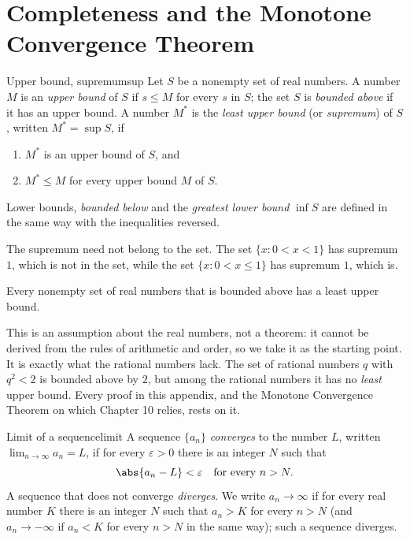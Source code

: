 \documentclass[11pt]{article}
\begin{document}
\section{Completeness and the Monotone Convergence Theorem}

\begin{defn}{Upper bound, supremum}{sup}
Let $S$ be a nonempty set of real numbers. A number $M$ is an \emph{upper bound} of $S$ if $s\le M$ for every $s$ in $S$; the set $S$ is \emph{bounded above} if it has an upper bound. A number $M^*$ is the \emph{least upper bound} (or \emph{supremum}) of $S$, written $M^*=\sup S$, if
\begin{enumerate}[label=(\roman*)]
  \item $M^*$ is an upper bound of $S$, and
  \item $M^*\le M$ for every upper bound $M$ of $S$.
\end{enumerate}
Lower bounds, \emph{bounded below} and the \emph{greatest lower bound} $\inf S$ are defined in the same way with the inequalities reversed.
\end{defn}

The supremum need not belong to the set. The set $\{x : 0<x<1\}$ has supremum $1$, which is not in the set, while the set $\{x : 0<x\le 1\}$ has supremum $1$, which is.

\begin{remark}
Every nonempty set of real numbers that is bounded above has a least upper bound.
\end{remark}

This is an assumption about the real numbers, not a theorem: it cannot be derived from the rules of arithmetic and order, so we take it as the starting point. It is exactly what the rational numbers lack. The set of rational numbers $q$ with $q^2<2$ is bounded above by $2$, but among the rational numbers it has no \emph{least} upper bound. Every proof in this appendix, and the Monotone Convergence Theorem on which Chapter 10 relies, rests on it.

\begin{defn}{Limit of a sequence}{limit}
A sequence $\{a_n\}$ \emph{converges} to the number $L$, written $\lim_{n\to\infty}a_n=L$, if for every $\varepsilon>0$ there is an integer $N$ such that
\[
\abs{a_n-L}<\varepsilon \quad\text{for every } n>N.
\]
A sequence that does not converge \emph{diverges}. We write $a_n\to\infty$ if for every real number $K$ there is an integer $N$ such that $a_n>K$ for every $n>N$ (and $a_n\to-\infty$ if $a_n<K$ for every $n>N$ in the same way); such a sequence diverges.
\end{defn}
\end{document}
